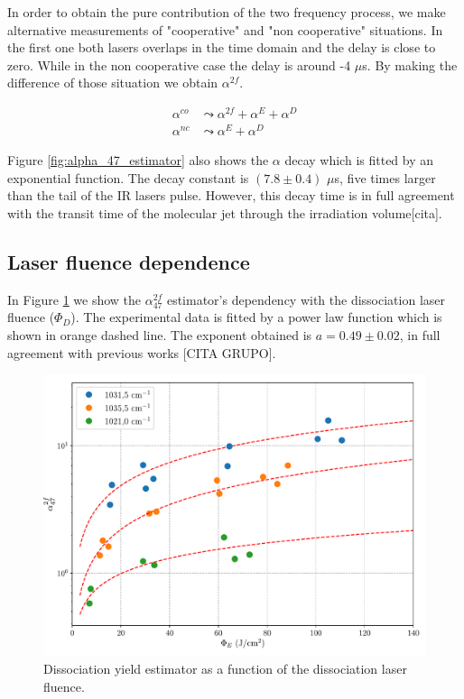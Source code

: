 \documentclass[global,twocolumn]{svjour}
\begin{document}
In order to obtain the pure contribution of the two frequency process, we make alternative measurements of "cooperative" and "non cooperative" situations. In the first one both lasers overlaps in the time domain and the delay is close to zero. While in the non cooperative case the delay is around -4 $\mu$s. By making the difference of those situation we obtain $\alpha^{2f}$. 

\begin{equation}
\begin{split}
\alpha^{co} &\leadsto \alpha^{2f} + \alpha^{E} + \alpha^{D} \\
\alpha^{nc} &\leadsto \alpha^{E} + \alpha^{D}
\end{split}
\label{alfa_47_co}
\end{equation}  

Figure \ref{fig:alpha_47_estimator} also shows the $\alpha$ decay which is fitted by an exponential function. The decay constant is $(7.8\pm0.4)$ $\mu$s, five times larger than the tail of the IR lasers pulse. However, this decay time is in full agreement with the transit time of the molecular jet through the irradiation volume[cita].  

\subsection{Laser fluence dependence}
In Figure \ref{fig:alpha_phi_excitation} we show the $\alpha^{2f}_{47}$ estimator's dependency with the dissociation laser fluence ($\Phi_{D}$). The experimental data is fitted by a power law function which is shown in orange dashed line. The exponent obtained is $a = 0.49\pm 0.02$, in full agreement with previous works [CITA GRUPO].  

\begin{figure}[h]
	\centering
	\includegraphics[width = 1\linewidth]{figures/alpha_47_phi_bombeo.pdf}
	\caption{ Dissociation yield estimator as a function of the dissociation laser fluence.}
	\label{fig:alpha_phi_excitation}
\end{figure}
\end{document}
